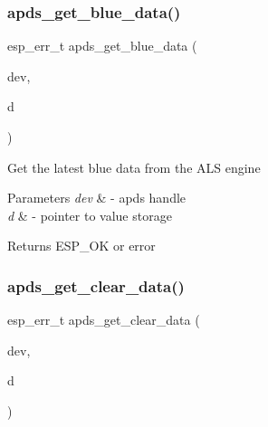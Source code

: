 \subsubsection{\texorpdfstring{apds\+\_\+get\+\_\+blue\+\_\+data()}{apds\_get\_blue\_data()}}
{\footnotesize\ttfamily esp\+\_\+err\+\_\+t apds\+\_\+get\+\_\+blue\+\_\+data (\begin{DoxyParamCaption}\item[{\hyperlink{structAPDS9960__Driver}{A\+P\+D\+S\+\_\+\+D\+EV}}]{dev,  }\item[{\hyperlink{vl53l0x__types_8h_a273cf69d639a59973b6019625df33e30}{uint16\+\_\+t} $\ast$}]{d }\end{DoxyParamCaption})}




\begin{DoxyItemize}
\item Get the latest blue data from the A\+LS engine 
\end{DoxyItemize}


\begin{DoxyParams}{Parameters}
{\em dev} & -\/ apds handle \\
\hline
{\em d} & -\/ pointer to value storage \\
\hline
\end{DoxyParams}
\begin{DoxyReturn}{Returns}
E\+S\+P\+\_\+\+OK or error 
\end{DoxyReturn}
\mbox{\label{group__APDS9960__DataFunctions_ga847d2ca19238c7a2a84080549962c7df}} 
\subsubsection{\texorpdfstring{apds\+\_\+get\+\_\+clear\+\_\+data()}{apds\_get\_clear\_data()}}
{\footnotesize\ttfamily esp\+\_\+err\+\_\+t apds\+\_\+get\+\_\+clear\+\_\+data (\begin{DoxyParamCaption}\item[{\hyperlink{structAPDS9960__Driver}{A\+P\+D\+S\+\_\+\+D\+EV}}]{dev,  }\item[{\hyperlink{vl53l0x__types_8h_a273cf69d639a59973b6019625df33e30}{uint16\+\_\+t} $\ast$}]{d }\end{DoxyParamCaption})}




